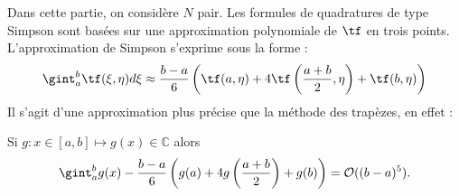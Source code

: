 Dans cette partie, on considère $N$ pair.
Les formules de quadratures de type Simpson sont basées sur une approximation polynomiale de $\tf$ en trois points. L'approximation de Simpson s'exprime sous la forme :
\begin{equation}
\gint_a^b \tf(\xi, \eta) d\xi \approx \dfrac{b-a}{6} \left( \tf(a,\eta) + 4  \tf \left( \dfrac{a+b}{2},\eta \right) + \tf(b,\eta) \right) 
\end{equation}
Il s'agit d'une approximation plus précise que la méthode des trapèzes, en effet :

\begin{proposition}
Si $g : x \in [a,b] \mapsto g(x) \in \mathbb{C}$ alors
\begin{equation}
\gint_a^b g(x) - \dfrac{b-a}{6} \left( g(a) + 4 g\left( \dfrac{a+b}{2} \right) + g(b) \right) = \mathcal{O}((b-a)^5).
\end{equation}
\end{proposition}


